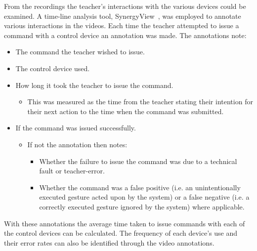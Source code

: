 \documentclass[manuscript, review, screen]{acmart}
\begin{document}
From the recordings the teacher's interactions with the various devices could be examined.
A time-line analysis tool, SynergyView~\cite{Kyaw2011}, was employed to annotate various interactions in the videos.
Each time the teacher attempted to issue a command with a control device an annotation was made.
The annotations note:
\begin{itemize}
\item The command the teacher wished to issue.
\item The control device used.
\item How long it took the teacher to issue the command.
\begin{itemize}
\item This was measured as the time from the teacher stating their intention for their next action to the time when the command was submitted.
\end{itemize}
\item If the command was issued successfully.
\begin{itemize}
\item If not the annotation then notes:
\begin{itemize}
\item Whether the failure to issue the command was due to a technical fault or teacher-error.
\item Whether the command was a false positive (i.e. an unintentionally executed gesture acted upon by the system) or a false negative (i.e. a correctly executed gesture ignored by the system) where applicable.\\
\end{itemize}
\end{itemize}
\end{itemize}
With these annotations the average time taken to issue commands with each of the control devices can be calculated.
The frequency of each device's use and their error rates can also be identified through the video annotations.


\end{document}
